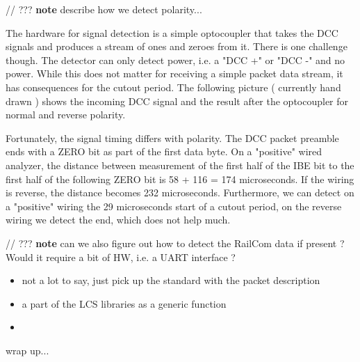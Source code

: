 // ??? \textbf{note} describe how we detect polarity...


The hardware for signal detection is a simple optocoupler that takes the DCC signals and produces a stream of ones and zeroes from it. There is one challenge though. The detector can only detect power, i.e. a "DCC +" or "DCC -" and no power. While this does not matter for receiving a simple packet data stream, it has consequences for the cutout period. The following picture ( currently hand drawn ) shows the incoming DCC signal and the result after the optocoupler for normal and reverse polarity.


Fortunately, the signal timing differs with polarity. The DCC packet preamble ends with a ZERO bit as part of the first data byte. On a "positive" wired analyzer, the distance between measurement of the first half of the IBE bit to the first half of the following ZERO bit is 58 + 116 = 174 microseconds. If the wiring is reverse, the distance becomes 232 microseconds. Furthermore, we can detect on a "positive" wiring the 29 microseconds start of a cutout period, on the reverse wiring we detect the end, which does not help much.

// ??? \textbf{note} can we also figure out how to detect the RailCom data if present ? Would it require a bit of HW, i.e. a UART interface ?


\begin{itemize}
\item not a lot to say, just pick up the standard with the packet description
\item a part of the LCS libraries as a generic function
\item 
\end{itemize}


wrap up...
